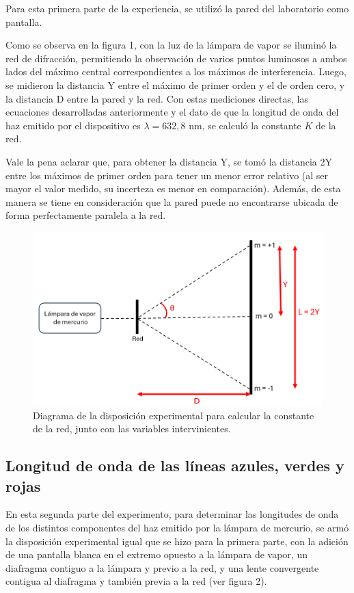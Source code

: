 \documentclass[12pt, a4paper]{article}
\begin{document}
Para esta primera parte de la experiencia, se utilizó la pared del laboratorio como pantalla.

Como se observa en la figura 1, con la luz de la lámpara de vapor se iluminó la red de difracción, permitiendo la observación de varios 
puntos luminosos a ambos lados del máximo central correspondientes a los máximos de interferencia. Luego, se midieron la distancia Y entre 
el máximo de primer orden y el de orden cero, y la distancia D entre la pared y la red. Con estas mediciones directas, las ecuaciones 
desarrolladas anteriormente y el dato de que la longitud de onda del haz emitido por el dispositivo es $\lambda = 632,8$ nm, se calculó 
la constante $K$ de la red.

Vale la pena aclarar que, para obtener la distancia Y, se tomó la distancia 2Y entre los máximos de primer orden para tener un menor error 
relativo (al ser mayor el valor medido, su incerteza es menor en comparación). Además, de esta manera se tiene en consideración que la 
pared puede no encontrarse ubicada de forma perfectamente paralela a la red.

\begin{figure}[!h] 
        \centering \includegraphics[width=0.9\columnwidth]{diagramaExperimental1.png}
        \caption{\label{fig1}Diagrama de la disposición experimental para calcular la constante de la red, junto con las variables 
        intervinientes.}
\end{figure}

\subsection{Longitud de onda de las líneas azules, verdes y rojas}

En esta segunda parte del experimento, para determinar las longitudes de onda de los distintos componentes del haz emitido por la lámpara 
de mercurio, se armó la disposición experimental igual que se hizo para la primera parte, con la adición de una pantalla blanca en el 
extremo opuesto a la lámpara de vapor, un diafragma contiguo a la lámpara y previo a la red, y una lente convergente contigua al diafragma 
y también previa a la red (ver figura 2).
\end{document}
